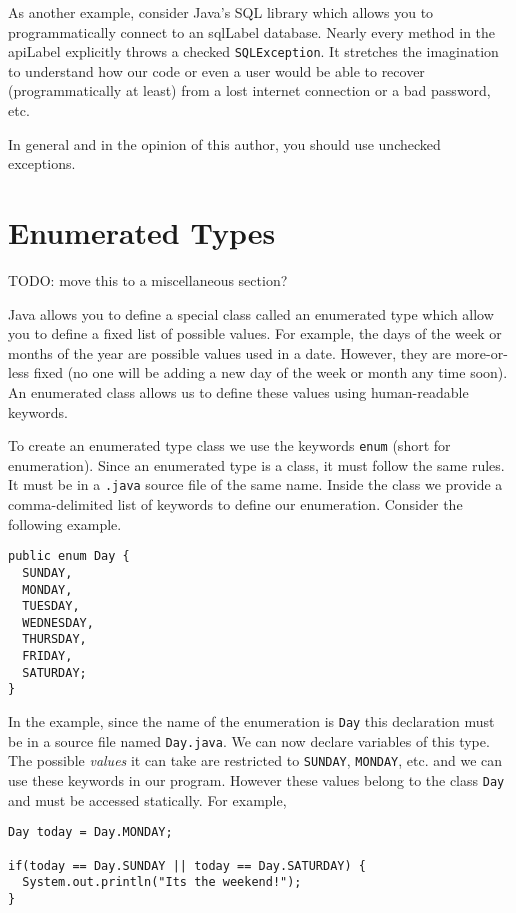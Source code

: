 As another example, consider Java's SQL library which allows you to 
programmatically connect to an \gls{sqlLabel} database.  Nearly every
method in the \gls{apiLabel} explicitly throws a checked \texttt{SQLException}.
It stretches the imagination to understand how our code or even a
user would be able to recover (programmatically at least) from 
a lost internet connection or a bad password, etc.  

In general and in the opinion of this author, you should use
unchecked exceptions.

\section{Enumerated Types}

TODO: move this to a miscellaneous section?

Java allows you to define a special class called an 
\gls{enumerated type} which allow you to define a fixed
list of possible values.  For example, the days of the
week or months of the year are possible values used in a date.
However, they are more-or-less fixed (no one will be adding a new
day of the week or month any time soon).  An enumerated 
class allows us to define these values using human-readable 
keywords.

To create an enumerated type class we use the keywords 
\texttt{enum} (short for enumeration).  Since an
enumerated type is a class, it must follow the same rules.
It must be in a \texttt{.java} source file of the same
name.  Inside the class we provide a comma-delimited 
list of keywords to define our enumeration.  
Consider the following example.

\begin{verbatim}
public enum Day {
  SUNDAY,
  MONDAY,
  TUESDAY,
  WEDNESDAY,
  THURSDAY,
  FRIDAY,
  SATURDAY;
}
\end{verbatim}

In the example, since the name of the enumeration is 
\texttt{Day} this declaration must be in a source file
named \texttt{Day.java}.  We can now declare 
variables of this type.  The possible \emph{values} it can 
take are restricted to \texttt{SUNDAY}, 
\texttt{MONDAY}, etc. and we can use these keywords 
in our program.  However these values belong to the
class \texttt{Day} and must be accessed statically.
For example,

\begin{verbatim}
Day today = Day.MONDAY;

if(today == Day.SUNDAY || today == Day.SATURDAY) {
  System.out.println("Its the weekend!");
}
\end{verbatim}

